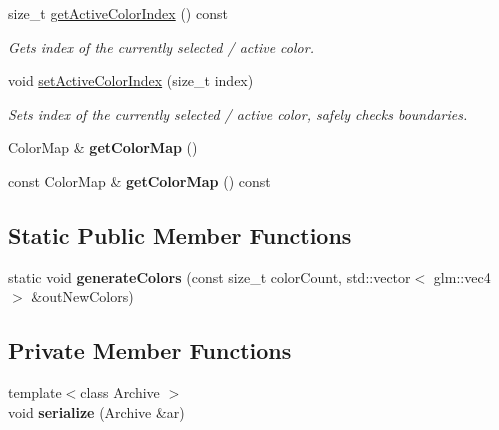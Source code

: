 \begin{DoxyCompactItemize}
\mbox{\label{classpepr3d_1_1_color_manager_a3532df102b706a03bc0e23401c457e4f}} 
size\+\_\+t \mbox{\hyperlink{classpepr3d_1_1_color_manager_a3532df102b706a03bc0e23401c457e4f}{get\+Active\+Color\+Index}} () const
\begin{DoxyCompactList}\small\item\em Gets index of the currently selected / active color. \end{DoxyCompactList}\item 
\mbox{\label{classpepr3d_1_1_color_manager_a81d621c28e948d1b3159dde1bcb73aea}} 
void \mbox{\hyperlink{classpepr3d_1_1_color_manager_a81d621c28e948d1b3159dde1bcb73aea}{set\+Active\+Color\+Index}} (size\+\_\+t index)
\begin{DoxyCompactList}\small\item\em Sets index of the currently selected / active color, safely checks boundaries. \end{DoxyCompactList}\item 
\mbox{\label{classpepr3d_1_1_color_manager_a7c86d46f583135d81ffe2842a8a2f8d1}} 
Color\+Map \& {\bfseries get\+Color\+Map} ()
\item 
\mbox{\label{classpepr3d_1_1_color_manager_acafb11f4d679dfe058c43ac3edc8a47c}} 
const Color\+Map \& {\bfseries get\+Color\+Map} () const
\end{DoxyCompactItemize}
\subsection*{Static Public Member Functions}
\begin{DoxyCompactItemize}
\item 
\mbox{\label{classpepr3d_1_1_color_manager_a9c9dcef30e057653f1ecc55071fdf12c}} 
static void {\bfseries generate\+Colors} (const size\+\_\+t color\+Count, std\+::vector$<$ glm\+::vec4 $>$ \&out\+New\+Colors)
\end{DoxyCompactItemize}
\subsection*{Private Member Functions}
\begin{DoxyCompactItemize}
\item 
\mbox{\label{classpepr3d_1_1_color_manager_a3fc86df9e3fcb8ac2efaedcd0f180676}} 
{\footnotesize template$<$class Archive $>$ }\\void {\bfseries serialize} (Archive \&ar)
\end{DoxyCompactItemize}
